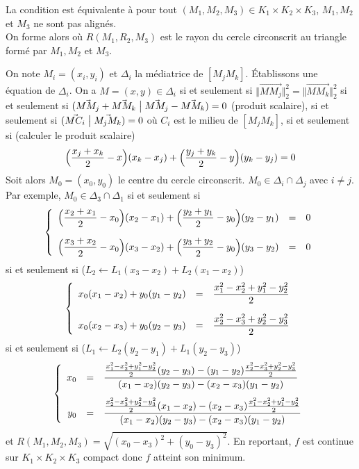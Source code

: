 \begin{solution}
	La condition est équivalente à pour tout $(M_{1},M_{2},M_{3})\in K_{1}\times K_{2}\times K_{3}$, $M_{1},M_{2}$ et $M_{3}$ ne sont pas alignés.\\
	On forme alors 
	où $R(M_{1},R_{2},M_{3})$ est le rayon du cercle circonscrit au triangle formé par $M_{1},M_{2}$ et $M_{3}$.

	On note $M_{i}=(x_{i},y_{i})$ et $\Delta_{i}$ la médiatrice de $[M_{j}M_{k}]$. Établissons une équation de $\Delta_{i}$. On a $M=(x,y)\in\Delta_{i}$ si et seulement si $\Vert \vec{MM_{j}}\Vert_{2}^{2}=\Vert\vec{MM_{k}}\Vert_{2}^{2}$ si et seulement si $(\vec{MM_{j}}+\vec{MM_{k}}\bigm|\vec{MM_{j}}-\vec{MM_{k}})=0$ (produit scalaire), si et seulement si $(\vec{MC_{i}}\bigm|\vec{M_{j}M_{k}})=0$ où $C_{i}$ est le milieu de $[M_{j}M_{k}]$, si et seulement si (calculer le produit scalaire)
	$$\Bigl(\frac{x_{j}+x_{k}}{2}-x\Bigr)(x_{k}-x_{j})+\Bigl(\frac{y_{j}+y_{k}}{2}-y\Bigr)(y_{k}-y_{j})=0$$
	Soit alors $M_{0}=(x_{0},y_{0})$ le centre du cercle circonscrit. $M_{0}\in\Delta_{i}\cap\Delta_{j}$ avec $i\neq j$. Par exemple, $M_{0}\in\Delta_{3}\cap\Delta_{1}$ si et seulement si
	$$
	\left\{
		\begin{array}[]{rcl}
			\Bigl(\dfrac{x_{2}+x_{1}}{2}-x_{0}\Bigr)(x_{2}-x_{1})+\Bigl(\dfrac{y_{2}+y_{1}}{2}-y_{0}\Bigr)(y_{2}-y_{1}) &= &0\\[0.5cm]
			\Bigl(\dfrac{x_{3}+x_{2}}{2}-x_{0}\Bigr)(x_{3}-x_{2})+\Bigl(\dfrac{y_{3}+y_{2}}{2}-y_{0}\Bigr)(y_{3}-y_{2}) &= &0
		\end{array}	
	\right.
	$$
	si et seulement si ($L_{2}\leftarrow L_{1}(x_{3}-x_{2})+L_{2}(x_{1}-x_{2})$)
	$$
	\left\{
		\begin{array}[]{rcl}
			x_{0}(x_{1}-x_{2})+y_{0}(y_{1}-y_{2})&=&\dfrac{x_{1}^{2}-x_{2}^{2}+y_{1}^{2}-y_{2}^{2}}{2}\\[0.5cm]
			x_{0}(x_{2}-x_{3})+y_{0}(y_{2}-y_{3})&=&\dfrac{x_{2}^{2}-x_{3}^{2}+y_{2}^{2}-y_{3}^{2}}{2}
		\end{array}	
	\right.
	$$
	si et seulement si ($L_{1}\leftarrow L_{2}(y_{2}-y_{1})+L_{1}(y_{2}-y_{3})$)
	$$
	\left\{
		\begin{array}[]{rcl}
			x_{0} &= & \dfrac{\frac{x_{1}^{2}-x_{2}^{2}+y_{1}^{2}-y_{2}^{2}}{2}(y_{2}-y_{3})-(y_{1}-y_{2})\frac{x_{2}^{2}-x_{3}^{2}+y_{2}^{2}-y_{3}^{2}}{2}}{(x_{1}-x_{2})(y_{2}-y_{3})-(x_{2}-x_{3})(y_{1}-y_{2})}\\[0.5cm]
			y_{0} &= & \dfrac{\frac{x_{2}^{2}-x_{3}^{2}+y_{2}^{2}-y_{3}^{2}}{2}(x_{1}-x_{2})-(x_{2}-x_{3})\frac{x_{1}^{2}-x_{2}^{2}+y_{1}^{2}-y_{2}^{2}}{2}}{(x_{1}-x_{2})(y_{2}-y_{3})-(x_{2}-x_{3})(y_{1}-y_{2})}
		\end{array}	
	\right.
	$$
	et $R(M_{1},M_{2},M_{3})=\sqrt{(x_{0}-x_{3})^{2}+(y_{0}-y_{3})^{2}}$. En reportant, $f$ est continue sur $K_{1}\times K_{2}\times K_{3}$ compact donc $f$ atteint son minimum.
\end{solution}

